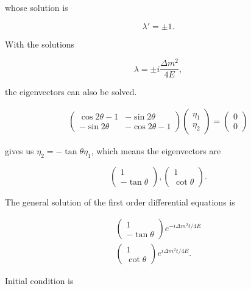 \documentclass{tufte-handout}
\begin{document}
whose solution is

\begin{equation*}
\lambda' = \pm 1.
\end{equation*}


With the solutions

\begin{equation*}
\lambda = \pm i \frac{\Delta m^2}{4E},
\end{equation*}

the eigenvectors can also be solved.

\begin{align*}
\begin{pmatrix}
\cos 2\theta - 1 &  -  \sin 2\theta \\  - \sin 2\theta & - \cos 2\theta -1 
\end{pmatrix} \begin{pmatrix}
\eta_1 \\ \eta_2
\end{pmatrix} = \begin{pmatrix}
0 \\ 0
\end{pmatrix}
\end{align*}

gives us $\eta_2 = -\tan \theta \eta_1$, which means the eigenvectors are

\begin{equation}
\begin{pmatrix}
1 \\ -\tan\theta
\end{pmatrix} , \begin{pmatrix}
1 \\ \cot \theta
\end{pmatrix}.
\end{equation}

The general solution of the first order differential equations is

\begin{align*}
\begin{pmatrix}
1 \\ -\tan\theta
\end{pmatrix} e^{-i \Delta m^2 t/ 4E } \\
\begin{pmatrix}
1 \\ \cot \theta
\end{pmatrix} e^{i  \Delta m^2 t/ 4E }.
\end{align*}

Initial condition is 
\end{document}
